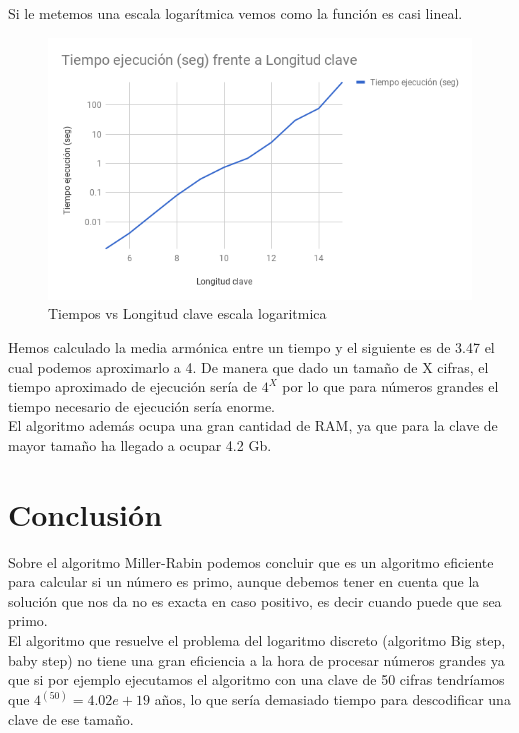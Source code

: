 Si le metemos una escala logarítmica vemos como la función es casi lineal.
\begin{figure}[H]
	\begin{center}
		\includegraphics[width=1\linewidth]{chart1}
		\caption{Tiempos vs Longitud clave escala logaritmica}
		\label{figura: tiempos2}
	\end{center}
\end{figure}



Hemos calculado la media armónica entre un tiempo y el siguiente es de 3.47 el cual podemos aproximarlo a 4. De manera que dado un tamaño de X cifras, el tiempo aproximado de ejecución sería de $4^X$ por lo que para números grandes el tiempo necesario de ejecución sería enorme.\\

El algoritmo además ocupa una gran cantidad de RAM, ya que para la clave de mayor tamaño ha llegado a ocupar 4.2 Gb.\\

\section*{Conclusión}

Sobre el algoritmo Miller-Rabin podemos concluir que es un algoritmo eficiente para calcular si un número es primo, aunque debemos tener en cuenta que la solución que nos da no es exacta en caso positivo, es decir cuando puede que sea primo. \\

El algoritmo que resuelve el problema del logaritmo discreto (algoritmo Big step, baby step) no tiene una gran eficiencia a la hora de procesar números grandes ya que si por ejemplo ejecutamos el algoritmo con una clave de 50 cifras tendríamos que $4^(50) = 4.02 e+19$ años, lo que sería demasiado tiempo para descodificar una clave de ese tamaño.\\


